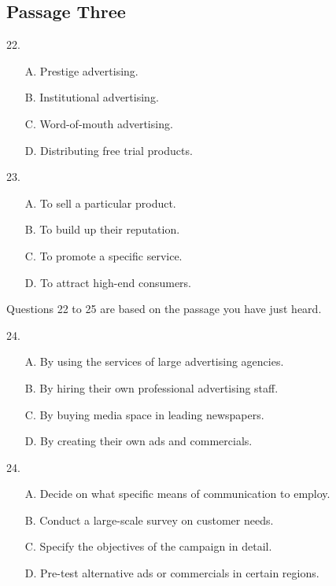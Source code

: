 \documentclass[UTF8,11pt]{ctexart}
\begin{document}
\subsection*{Passage Three}


22.


\begin{itemize}[leftmargin=2em,itemsep=.2em,topsep=.4em]\item[A.] Prestige advertising.
\item[B.] Institutional advertising.
\item[C.] Word-of-mouth advertising.
\item[D.] Distributing free trial products.
\end{itemize}

23.


\begin{itemize}[leftmargin=2em,itemsep=.2em,topsep=.4em]\item[A.] To sell a particular product.
\item[B.] To build up their reputation.
\item[C.] To promote a specific service.
\item[D.] To attract high-end consumers.
\end{itemize}

Questions 22 to 25 are based on the passage you have just heard.


24.


\begin{itemize}[leftmargin=2em,itemsep=.2em,topsep=.4em]\item[A.] By using the services of large advertising agencies.
\item[B.] By hiring their own professional advertising staff.
\item[C.] By buying media space in leading newspapers.
\item[D.] By creating their own ads and commercials.
\end{itemize}

24.


\begin{itemize}[leftmargin=2em,itemsep=.2em,topsep=.4em]\item[A.] Decide on what specific means of communication to employ.
\item[B.] Conduct a large-scale survey on customer needs.
\item[C.] Specify the objectives of the campaign in detail.
\item[D.] Pre-test alternative ads or commercials in certain regions.
\end{itemize}
\end{document}
